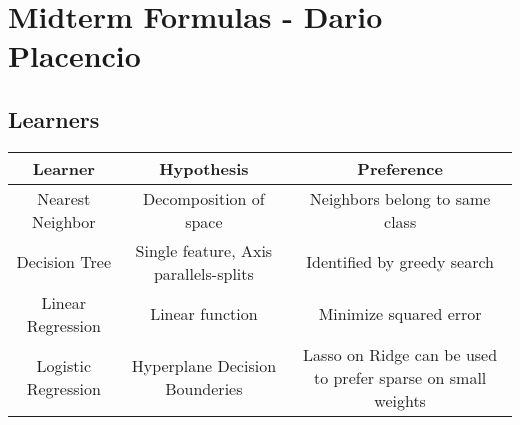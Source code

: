 \documentclass[a4paper,7pt]{extarticle}
\theoremstyle{definition}
\begin{document}
\section{Midterm Formulas - Dario Placencio}

\subsection{Learners}

\begin{tabular}{|c|c|c|}
\hline
Learner & Hypothesis & Preference \\
\hline
Nearest Neighbor & Decomposition of space & Neighbors belong to same class \\
\hline
Decision Tree & Single feature, Axis parallels-splits & Identified by greedy search \\
\hline
Linear Regression & Linear function & Minimize squared error \\
\hline
Logistic Regression & Hyperplane Decision Bounderies & Lasso on Ridge can be  used to prefer sparse on small weights \\
\hline
\end{tabular}
\end{document}
